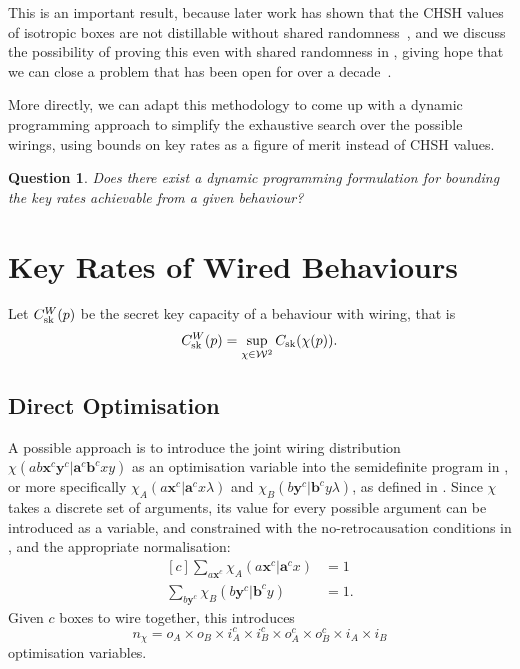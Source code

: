 \documentclass[10pt, a4paper]{article}
\numberwithin{equation}{section} %
\theoremstyle{definition}
\theoremstyle{plain}
\newtheorem{question}{Question}
\newcommand{\?}{\mathrel{?}} %
\newcommand{\cvec}[1]{\boldsymbol{\mathbf{#1}}}    %
\newcommand{\sW}{\mathcal{W}}
\newcommand{\sk}{\rm sk}
\begin{document}
      This is an important result, because later work has shown that the CHSH values of isotropic boxes are not distillable without shared randomness~\cite{NLMonotones}, and we discuss the possibility of proving this even with shared randomness in , giving hope that we can close a problem that has been open for over a decade~\cite{NLLimits, DistillationBounds}.

      More directly, we can adapt this methodology to come up with a dynamic programming approach to simplify the exhaustive search over the possible wirings, using bounds on key rates as a figure of merit instead of CHSH values.

      \begin{question}
        Does there exist a dynamic programming formulation for bounding the key rates achievable from a given behaviour?
      \end{question}

      \section{Key Rates of Wired Behaviours}

      Let \(C^{W}_{\sk}(p)\) be the secret key capacity of a behaviour with wiring, that is
      \begin{equation}
        C^{W}_{\sk}(p) = \sup_{\chi\in\sW^2} C_{\sk}(\chi(p)).
      \end{equation}

      \subsection{Direct Optimisation}

      A possible approach is to introduce the joint wiring distribution \(\chi(ab\cvec{x}^c\cvec{y}^c|\cvec{a}^c\cvec{b}^cxy)\) as an optimisation variable into the semidefinite program in , or more specifically \(\chi_A(a\cvec{x}^c|\cvec{a}^cx \lambda)\) and \(\chi_B(b\cvec{y}^c|\cvec{b}^cy \lambda)\), as defined in . Since \(\chi\) takes a discrete set of arguments, its value for every possible argument can be introduced as a variable, and constrained with the no-retrocausation conditions in , and the appropriate normalisation:
      \begin{equation}
        \begin{aligned}[c]
          \sum_{a\cvec{x}^c} \chi_A(a\cvec{x}^c|\cvec{a}^cx) &= 1 \\
          \sum_{b\cvec{y}^c} \chi_B(b\cvec{y}^c|\cvec{b}^cy) &= 1.
        \end{aligned}
      \end{equation}
      Given \(c\) boxes to wire together, this introduces
      \begin{equation}
        n_{\chi} = o_A \times o_B \times i_A^c \times i_B^c \times o_A^c \times o_B^c \times i_A \times i_B
      \end{equation}
      optimisation variables.
\end{document}
